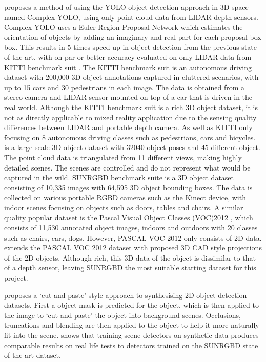 \documentclass[11pt]{article}
\begin{document}
\cite{complex_YOLO} proposes a method of using the YOLO object detection approach in 3D space named Complex-YOLO, using only point cloud data from LIDAR depth sensors. Complex-YOLO uses a Euler-Region Proposal Network which estimates the orientation of objects by adding an imaginary and real part for each proposal box box. This results in 5 times speed up in object detection from the previous state of the art, with on par or better accuracy evaluated on only LIDAR data from KITTI benchmark suit \cite{KITTI}. The KITTI benchmark suit is an autonomous driving dataset with 200,000 3D object annotations captured in cluttered scenarios, with up to 15 cars and 30 pedestrians in each image. The data is obtained from a stereo camera and LIDAR sensor mounted on top of a car that is driven in the real world. Although the KITTI benchmark suit is a rich 3D object dataset, it is not as directly applicable to mixed reality application due to the sensing quality differences between LIDAR and portable depth camera. As well as KITTI only focusing on 8 autonomous driving classes such as pedestrians, cars and bicycles. \cite{3D_dataset} is a large-scale 3D object dataset with 32040 object poses and 45 different
object. The point cloud data is triangulated from 11 different views, making highly detailed scenes. The scenes are controlled and do not represent what would be captured in the wild. SUNRGBD benchmark suite \cite{SUNRGBD} is a 3D object dataset consisting of 10,335 images with 64,595 3D object bounding boxes. The data is collected on various portable RGBD cameras such as the Kinect device, with indoor scenes focusing on objects such as doors, tables and chairs. A similar quality popular dataset is the Pascal Visual Object Classes (VOC)2012 \cite{pascal-voc-2012}, which consists of 11,530 annotated object images, indoors and outdoors with 20 classes such as chairs, cars, dogs. However, PASCAL VOC 2012 only consists of 2D data. \cite{PASCAL_3D} extends the PASCAL VOC 2012 dataset with proposed 3D CAD style projections of the 2D objects. Although rich, this 3D data of the object is dissimilar to that of a depth sensor, leaving SUNRGBD the most suitable starting dataset for this project.

\cite{cut_paste} proposes a `cut and paste' style approach to synthesising 2D object detection datasets. First a object mask is predicted for the object, which is then applied to the image to `cut and paste' the object into background scenes. Occlusions, truncations and blending are then applied to the object to help it more naturally fit into the scene. \cite{synthetic_train} shows that training scene detectors on synthetic data produces comparable results on real life tests to detectors trained on the SUNRGBD state of the art dataset.
\end{document}
